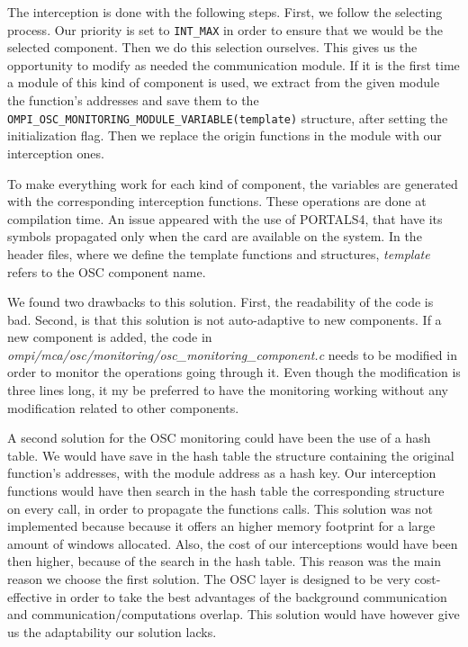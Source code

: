 \documentclass[notitlepage]{article}
\newcommand{\brkunds}[0]{\allowbreak\_}
\begin{document}
The interception is done with the following steps. First, we follow
the selecting process. Our priority is set to {\tt INT\brkunds{}MAX}
in order to ensure that we would be the selected component. Then we do
this selection ourselves. This gives us the opportunity to modify as
needed the communication module. If it is the first time a module of
this kind of component is used, we extract from the given module the
function's addresses and save them to the {\tt
  OMPI\brkunds{}OSC\brkunds{}MONITORING\brkunds{}MODULE\brkunds{}VARIABLE(template)}
structure, after setting the initialization flag. Then we replace the
origin functions in the module with our interception ones.

To make everything work for each kind of component, the variables are
generated with the corresponding interception functions. These
operations are done at compilation time. An issue appeared with the
use of PORTALS4, that have its symbols propagated only when the card
are available on the system. In the header files, where we define the
template functions and structures, {\it template} refers to the OSC
component name.

We found two drawbacks to this solution. First, the readability of the
code is bad. Second, is that this solution is not auto-adaptive to new
components. If a new component is added, the code in {\it
  ompi/mca/osc/monitoring/osc\brkunds{}monitoring\brkunds{}component.c}
needs to be modified in order to monitor the operations going through
it. Even though the modification is three lines long, it my be
preferred to have the monitoring working without any modification
related to other components.

A second solution for the OSC monitoring could have been the use of a
hash table. We would have save in the hash table the structure
containing the original function's addresses, with the module address
as a hash key. Our interception functions would have then search in
the hash table the corresponding structure on every call, in order to
propagate the functions calls. This solution was not implemented
because because it offers an higher memory footprint for a large
amount of windows allocated. Also, the cost of our interceptions would
have been then higher, because of the search in the hash table. This
reason was the main reason we choose the first solution. The OSC layer
is designed to be very cost-effective in order to take the best
advantages of the background communication and
communication/computations overlap. This solution would have however
give us the adaptability our solution lacks.
\end{document}
